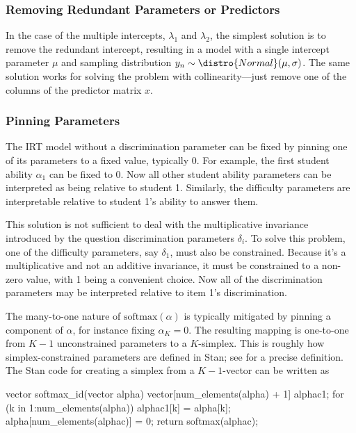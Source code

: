 \subsubsection{Removing Redundant Parameters or Predictors}

In the case of the multiple intercepts, $\lambda_1$ and $\lambda_2$,
the simplest solution is to remove the redundant intercept, resulting
in a model with a single intercept parameter $\mu$ and sampling
distribution $y_n \sim \distro{Normal}(\mu, \sigma)$.  The same
solution works for solving the problem with collinearity---just remove
one of the columns of the predictor matrix $x$.

\subsubsection{Pinning Parameters}

The IRT model without a discrimination parameter can be fixed by
pinning one of its parameters to a fixed value, typically 0.  For
example, the first student ability $\alpha_1$ can be fixed to 0.  Now
all other student ability parameters can be interpreted as being
relative to student 1.  Similarly, the difficulty parameters are
interpretable relative to student 1's ability to answer them.

This solution is not sufficient to deal with the multiplicative
invariance introduced by the question discrimination parameters
$\delta_i$.  To solve this problem, one of the difficulty parameters,
say $\delta_1$, must also be constrained.  Because it's a
multiplicative and not an additive invariance, it must be constrained
to a non-zero value, with 1 being a convenient choice.  Now all of the
discrimination parameters may be interpreted relative to item 1's
discrimination.

The many-to-one nature of $\mbox{softmax}(\alpha)$ is typically
mitigated by pinning a component of $\alpha$, for instance fixing
$\alpha_K = 0$.  The resulting mapping is one-to-one from $K-1$
unconstrained parameters to a $K$-simplex.  This is roughly how
simplex-constrained parameters are defined in Stan; see
 for a precise definition.  The Stan
code for creating a simplex from a $K-1$-vector can be written as
%
\begin{stancode}
vector softmax_id(vector alpha) {
  vector[num_elements(alpha) + 1] alphac1;
  for (k in 1:num_elements(alpha))
    alphac1[k] = alpha[k];
  alpha[num_elements(alphac)] = 0;
  return softmax(alphac);
}
\end{stancode}




